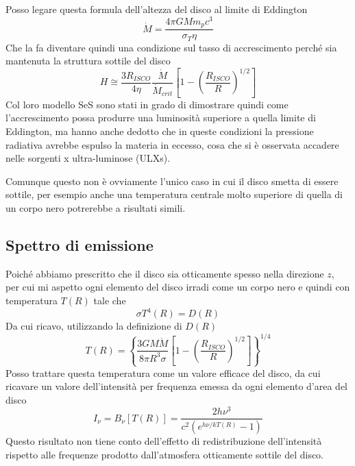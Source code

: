 \documentclass[a4paperbi]{article}
\begin{document}
	Posso legare questa formula dell'altezza del disco al limite di Eddington
	\begin{equation*}
		\dot{M}=\frac{4\pi GMm_pc^3}{\sigma_T \eta}
	\end{equation*}
	Che la fa diventare quindi una condizione sul tasso di accrescimento perché sia mantenuta la struttura sottile del disco
	\begin{equation}
		H\cong\frac{3R_{ISCO}}{4\eta}\frac{\dot{M}}{\dot{M}_{crit}}\left[1-\left(\frac{R_{ISCO}}{R}\right)^{1/2}\right]
	\end{equation}
	Col loro modello SeS sono stati in grado di dimostrare quindi come l'accrescimento possa produrre una luminosità superiore a quella limite di Eddington, ma hanno anche dedotto che in queste condizioni la pressione radiativa avrebbe espulso la materia in eccesso, cosa che si è osservata accadere  nelle sorgenti x ultra-luminose (ULXs).
	
	Comunque questo non è ovviamente l'unico caso in cui il disco smetta di essere sottile, per esempio anche una temperatura centrale molto superiore di quella di un corpo nero potrerebbe a risultati simili.
	
\subsection{Spettro di emissione}

	Poiché abbiamo prescritto che il disco sia otticamente spesso nella direzione $z$, per cui mi aspetto ogni elemento del disco irradi come un corpo nero e quindi con temperatura $T(R)$ tale che
	\begin{equation}
		\sigma T^4(R)=D(R)
	\end{equation}
	Da cui ricavo, utilizzando la definizione di $D(R)$
	\begin{equation}
		T(R)=\left\{\frac{3GM\dot{M}}{8\pi R^3\sigma}\left[1-\left(\frac{R_{ISCO}}{R}\right)^{1/2}\right]\right\}^{1/4}
	\end{equation}
	Posso trattare questa temperatura come un valore efficace del disco, da cui ricavare un valore dell'intensità per frequenza emessa da ogni elemento d'area del disco
	\begin{equation}
		I_\nu=B_\nu[T(R)]=\frac{2h\nu^3}{c^2(e^{h\nu/kT(R)}-1)}
	\end{equation}
	Questo risultato non tiene conto dell'effetto di redistribuzione dell'intensità rispetto alle frequenze prodotto dall'atmosfera otticamente sottile del disco.
	
\end{document}
